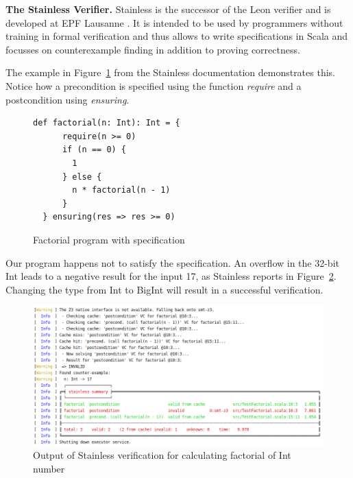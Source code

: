 \documentclass[runningheads]{llncs}
\renewcommand{\paragraph}{\textbf}%
\begin{document}
\paragraph{The Stainless Verifier.} Stainless is the successor of the
Leon verifier
\cite{DBLP:conf/ecoop/BlancKKS13,DBLP:conf/pldi/VoirolKK15,DBLP:conf/pldi/BlancK15}
and is developed at EPF Lausanne
\cite{Stainless:github}. It is intended to be
used by programmers without training in formal verification and thus
allows to write specifications in Scala and focusses on counterexample
finding in addition to proving correctness.

The example in Figure~\ref{fig:factorial} from the Stainless documentation
\cite{Stainless:documentation} demonstrates this. Notice how a
precondition is specified using the function \emph{require} and a
postcondition using \emph{ensuring}.

\begin{figure}
\begin{lstlisting}[style=scala]
  def factorial(n: Int): Int = {
      require(n >= 0)
      if (n == 0) {
        1
      } else {
        n * factorial(n - 1)
      }
  } ensuring(res => res >= 0)
\end{lstlisting}
	\caption{Factorial program with specification}
	\label{fig:factorial}
\end{figure}
Our program happens not to satisfy the specification. An overflow in
the 32-bit Int leads to a negative result for the input 17, as
Stainless reports in Figure~\ref{fig:failed}. Changing the type from
Int to BigInt will result in a successful verification.

\begin{figure}
	\centering
		\includegraphics[width=\textwidth]{output1.png}
	\caption{Output of Stainless verification for calculating factorial of Int number}
	\label{fig:failed}
\end{figure}
\end{document}
